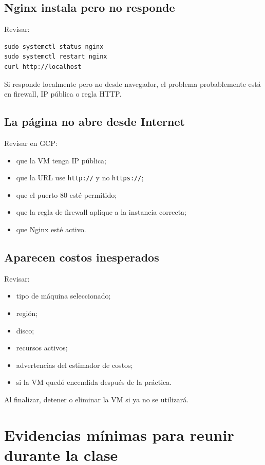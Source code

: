 \documentclass[
  coursetitle={Cómputo Nube y Tecnologías Emergentes},
  coursehours={96},
  coursedate={Verano 2026},
  doctype={Práctica},
  otherlangs={english,french},
  authorname={Lázaro},
  authorsurname={Bustio-Martínez},
  authortitle={PhD},
  role={Profesor Investigador},
  email={lbustio@inaoe.mx},
  phone={5559504000},
  ext={7459},
  institution={Instituto Nacional de Astrofísica, Óptica y Electrónica (INAOE)},
  department={Maestría en Ciencias en Tecnologías de Seguridad},
  address={Luis Enrique Erro 1, Sta. Ma. Tonantzintla, San Andrés Cholula, CP 72840, Puebla, México},
  margin={0.5in}
]{../../lbustio_lecture_notes}
\begin{document}
\subsection{Nginx instala pero no responde}

Revisar:

\begin{lstlisting}
sudo systemctl status nginx
sudo systemctl restart nginx
curl http://localhost
\end{lstlisting}

Si responde localmente pero no desde navegador, el problema probablemente está en firewall, IP pública o regla HTTP.

\subsection{La página no abre desde Internet}

Revisar en GCP:

\begin{itemize}
    \item que la VM tenga IP pública;
    \item que la URL use \texttt{http://} y no \texttt{https://};
    \item que el puerto 80 esté permitido;
    \item que la regla de firewall aplique a la instancia correcta;
    \item que Nginx esté activo.
\end{itemize}

\subsection{Aparecen costos inesperados}

Revisar:

\begin{itemize}
    \item tipo de máquina seleccionado;
    \item región;
    \item disco;
    \item recursos activos;
    \item advertencias del estimador de costos;
    \item si la VM quedó encendida después de la práctica.
\end{itemize}

Al finalizar, detener o eliminar la VM si ya no se utilizará.

\section{Evidencias mínimas para reunir durante la clase}
\end{document}
